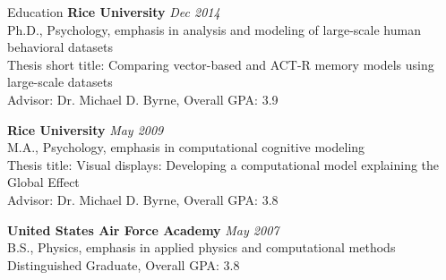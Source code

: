  
\begin{rSection}{Education}
  {\bf Rice University} \hfill {\em Dec 2014} \\
  Ph.D., Psychology, emphasis in analysis and modeling of large-scale human behavioral datasets \\
  Thesis short title: Comparing vector-based and ACT-R memory models using large-scale datasets \\
  Advisor: Dr. Michael D. Byrne, Overall GPA: 3.9
\item {\bf Rice University} \hfill {\em May 2009} \\ 
  M.A., Psychology, emphasis in computational cognitive modeling \\
  Thesis title: Visual displays: Developing a computational model explaining the Global Effect \\
  Advisor: Dr. Michael D. Byrne, Overall GPA: 3.8
\item {\bf United States Air Force Academy} \hfill {\em May 2007} \\ 
  B.S., Physics, emphasis in applied physics and computational methods \\
  Distinguished Graduate, Overall GPA: 3.8 
\end{rSection}

